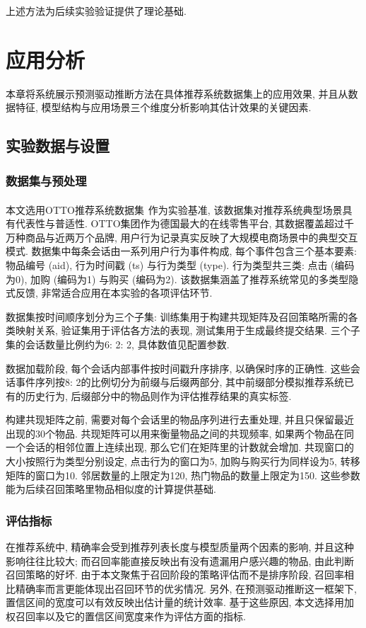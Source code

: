 \documentclass[a4paper, AutoFakeBold, UTF8]{ctexrep}
\theoremstyle{plain}
\newcommand{\upcite}[1]
{\textsuperscript{~\cite{#1}}}
\numberwithin{equation}{chapter}
\begin{document}
上述方法为后续实验验证提供了理论基础. 
\chapter{应用分析}
本章将系统展示预测驱动推断方法在具体推荐系统数据集上的应用效果, 并且从数据特征, 模型结构与应用场景三个维度分析影响其估计效果的关键因素. 

\section{实验数据与设置}

\subsection{数据集与预处理}

本文选用OTTO推荐系统数据集\upcite{OTTO2022}作为实验基准, 该数据集对推荐系统典型场景具有代表性与普适性. OTTO集团作为德国最大的在线零售平台, 其数据覆盖超过千万种商品与近两万个品牌, 用户行为记录真实反映了大规模电商场景中的典型交互模式. 数据集中每条会话由一系列用户行为事件构成, 每个事件包含三个基本要素: 物品编号 (aid), 行为时间戳 (ts) 与行为类型 (type). 行为类型共三类: 点击 (编码为0), 加购 (编码为1) 与购买 (编码为2). 该数据集涵盖了推荐系统常见的多类型隐式反馈, 非常适合应用在本实验的各项评估环节. 

数据集按时间顺序划分为三个子集: 训练集用于构建共现矩阵及召回策略所需的各类映射关系, 验证集用于评估各方法的表现, 测试集用于生成最终提交结果. 三个子集的会话数量比例约为6: 2: 2, 具体数值见配置参数. 


数据加载阶段, 每个会话内部事件按时间戳升序排序, 以确保时序的正确性. 这些会话事件序列按8: 2的比例切分为前缀与后缀两部分, 其中前缀部分模拟推荐系统已有的历史行为, 后缀部分中的物品则作为评估推荐结果的真实标签. 

构建共现矩阵之前, 需要对每个会话里的物品序列进行去重处理, 并且只保留最近出现的30个物品. 共现矩阵可以用来衡量物品之间的共现频率, 如果两个物品在同一个会话的相邻位置上连续出现, 那么它们在矩阵里的计数就会增加. 共现窗口的大小按照行为类型分别设定, 点击行为的窗口为5, 加购与购买行为同样设为5, 转移矩阵的窗口为10. 邻居数量的上限定为120, 热门物品的数量上限定为150. 这些参数能为后续召回策略里物品相似度的计算提供基础. 

\subsection{评估指标}
在推荐系统中, 精确率会受到推荐列表长度与模型质量两个因素的影响, 并且这种影响往往比较大; 而召回率能直接反映出有没有遗漏用户感兴趣的物品, 由此判断召回策略的好坏. 由于本文聚焦于召回阶段的策略评估而不是排序阶段, 召回率相比精确率而言更能体现出召回环节的优劣情况. 另外, 在预测驱动推断这一框架下, 置信区间的宽度可以有效反映出估计量的统计效率. 基于这些原因, 本文选择用加权召回率以及它的置信区间宽度来作为评估方面的指标. 
\end{document}
